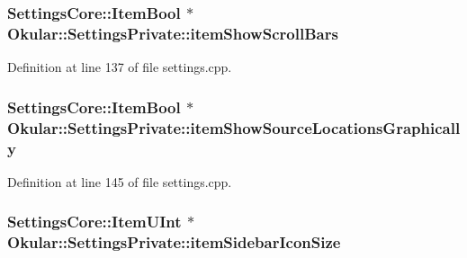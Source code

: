 \hypertarget{classOkular_1_1SettingsPrivate_af6978684b7cec666e2687e10cea23584}{
\subsubsection[{item\+Show\+Scroll\+Bars}]{\setlength{\rightskip}{0pt plus 5cm}Settings\+Core\+::\+Item\+Bool $\ast$ Okular\+::\+Settings\+Private\+::item\+Show\+Scroll\+Bars}}\label{classOkular_1_1SettingsPrivate_af6978684b7cec666e2687e10cea23584}


Definition at line 137 of file settings.\+cpp.

\hypertarget{classOkular_1_1SettingsPrivate_a52a3dd610296e632468dd63ed3d165fe}{
\subsubsection[{item\+Show\+Source\+Locations\+Graphically}]{\setlength{\rightskip}{0pt plus 5cm}Settings\+Core\+::\+Item\+Bool $\ast$ Okular\+::\+Settings\+Private\+::item\+Show\+Source\+Locations\+Graphically}}\label{classOkular_1_1SettingsPrivate_a52a3dd610296e632468dd63ed3d165fe}


Definition at line 145 of file settings.\+cpp.

\hypertarget{classOkular_1_1SettingsPrivate_a215c33520932cea9ea809c3434198080}{
\subsubsection[{item\+Sidebar\+Icon\+Size}]{\setlength{\rightskip}{0pt plus 5cm}Settings\+Core\+::\+Item\+U\+Int $\ast$ Okular\+::\+Settings\+Private\+::item\+Sidebar\+Icon\+Size}}\label{classOkular_1_1SettingsPrivate_a215c33520932cea9ea809c3434198080}


